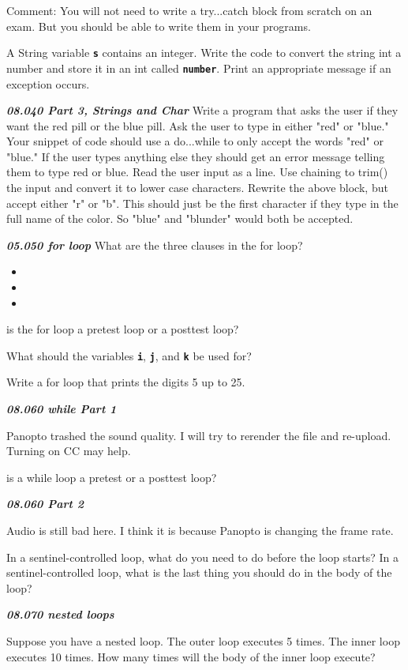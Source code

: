 \documentclass[letterpaper,11pt]{exam}
\newcommand{\videoheading}[1]{\Large\textbf{\textit{#1}}}
\begin{document}
\begin{questions}
Comment:  You will not need to write a try...catch block from scratch on an exam.  But you should be able to write them in your programs.

\question A String variable \texttt{\textbf{s}} contains an integer.  Write the code to convert the string int a number and store it in an int called \texttt{\textbf{number}}. Print an appropriate message if an exception occurs.
\vspace{1cm}

\videoheading{08.040 Part 3, Strings and Char}
\question Write a program that asks the user if they want the red pill or the blue pill.  Ask the user to type in either "red" or "blue."  Your snippet of code should use a do...while to only accept the words "red" or "blue."  If the user types anything else they should get an error message telling them to type red or blue.  Read the user input as a line.  Use chaining to trim() the input and convert it to lower case characters.
\vspace{5cm}
\question Rewrite the above block, but accept either "r" or "b".  This should just be the first character if they type in the full name of the color.  So "blue" and "blunder" would both be accepted.
\vspace{5cm}

\videoheading{05.050 for loop}
\question What are the three clauses in the for loop?
\begin{itemize}
  \item
  \item
  \item 
\end{itemize}

\question is the for loop a pretest loop or a posttest loop?

\question What should the variables \texttt{\textbf{i}}, \texttt{\textbf{j}}, and \texttt{\textbf{k}} be used for?

\question Write a for loop that prints the digits 5 up to 25.
\vspace{2cm}

\videoheading{08.060 while Part 1}

Panopto trashed the sound quality.  I will try to rerender the file and re-upload.  Turning on CC may help.

\question is a while loop a pretest or a posttest loop? 

\videoheading{08.060 Part 2}

Audio is still bad here.  I think it is because Panopto is changing the frame rate.

\question In a sentinel-controlled loop, what do you need to do before the loop starts?
\question In a sentinel-controlled loop, what is the last thing you should do in the body of the loop?

\videoheading{08.070 nested loops}

\question Suppose you have a nested loop.  The outer loop executes 5 times.  The inner loop executes 10 times.  How many times will the body of the inner loop execute?


\end{questions}
\end{document}

